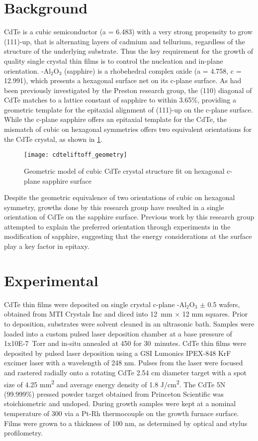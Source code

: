\section{Background}
CdTe is a cubic semiconductor (a = 6.483) with a very strong propensity to grow (111)-up, that is alternating layers of cadmium and tellurium, regardless of the structure of the underlying substrate.
Thus the key requirement for the growth of quality single crystal thin films is to control the nucleation and in-plane orientation. \textalpha-Al\(_2\)O\(_3\) (sapphire) is a rhobehedral complex oxide (a = 4.758, c = 12.991), which presents a hexagonal surface net on its c-plane surface.
As had been previously investigated by the Preston research group, the (110) diagonal of CdTe matches to a lattice constant of sapphire to within 3.65\%, providing a geometric template for the epitaxial alignment of (111)-up on the 
c-plane surface.
While the c-plane sapphire offers an epitaxial template for the CdTe, the mismatch of cubic on hexagonal symmetries offers two equivalent orientations for the CdTe crystal, as shown in \cref{fig:cdteliftoff_geometry}.
\begin{figure}
 \centering \texttt{[image: cdteliftoff\_geometry]}
 \caption{\label{fig:cdteliftoff_geometry}Geometric model of cubic CdTe crystal structure fit on hexagonal c-plane sapphire surface}
\end{figure}
Despite the geometric equivalence of two orientations of cubic on hexagonal symmetry, growths done by this research group have resulted in a single orientation of CdTe on the sapphire surface.
Previous work by this research group attempted to explain the preferred orientation through experiments in the modification of sapphire\cite{Neretina2009b}, suggesting that the energy considerations at the surface play a key factor in epitaxy.
\section{Experimental}
CdTe thin films were deposited on single crystal c-plane \textalpha-Al\(_2\)O\(_3\) \(\pm\) 0.5\degree{} wafers, obtained from MTI Crystals Inc and diced into 12~mm \(\times\) 12 mm squares.
Prior to deposition, substrates were solvent cleaned in an ultrasonic bath.
Samples were loaded into a custom pulsed laser deposition chamber at a base pressure of 1x10E-7~Torr and in-situ annealed at 450\celsius{} for 30~minutes.
CdTe thin films were deposited by pulsed laser deposition using a GSI Lumonics IPEX-848 KrF excimer laser with a wavelength of 248 nm.
Pulses from the laser were focused and rastered radially onto a rotating CdTe 2.54 cm diameter target with a spot size of 4.25 mm\textsuperscript{2} and average energy density of 1.8 J/cm\textsuperscript{2}.
The CdTe 5N (99.999\%) pressed powder 
target obtained from Princeton Scientific was stoichiometric and undoped.
During growth samples were kept at a nominal temperature of 300\celsius{} via a Pt-Rh thermocouple on the growth furnace surface.
Films were grown to a thickness of 100 nm, as determined by optical and stylus profilometry.


